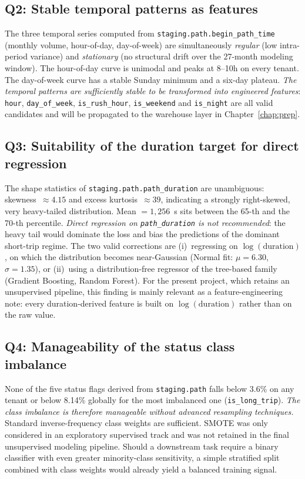 \subsection{Q2: Stable temporal patterns as features}
The three temporal series computed from \texttt{staging.path.begin\_path\_time} (monthly volume, hour-of-day, day-of-week) are simultaneously \emph{regular} (low intra-period variance) and \emph{stationary} (no structural drift over the 27-month modeling window). The hour-of-day curve is unimodal and peaks at 8--10h on every tenant. The day-of-week curve has a stable Sunday minimum and a six-day plateau. \emph{The temporal patterns are sufficiently stable to be transformed into engineered features}: \texttt{hour}, \texttt{day\_of\_week}, \texttt{is\_rush\_hour}, \texttt{is\_weekend} and \texttt{is\_night} are all valid candidates and will be propagated to the warehouse layer in Chapter~\ref{chap:prep}.

\subsection{Q3: Suitability of the duration target for direct regression}
The shape statistics of \texttt{staging.path.path\_duration} are unambiguous: skewness~$\approx 4.15$ and excess kurtosis~$\approx 39$, indicating a strongly right-skewed, very heavy-tailed distribution. Mean $=1{,}256$~s sits between the 65-th and the 70-th percentile. \emph{Direct regression on \texttt{path\_duration} is not recommended}: the heavy tail would dominate the loss and bias the predictions of the dominant short-trip regime. The two valid corrections are (i)~regressing on $\log(\text{duration})$, on which the distribution becomes near-Gaussian (Normal fit: $\mu = 6.30$, $\sigma = 1.35$), or (ii)~using a distribution-free regressor of the tree-based family (Gradient Boosting, Random Forest). For the present project, which retains an unsupervised pipeline, this finding is mainly relevant as a feature-engineering note: every duration-derived feature is built on $\log(\text{duration})$ rather than on the raw value.

\subsection{Q4: Manageability of the status class imbalance}
None of the five status flags derived from \texttt{staging.path} falls below 3.6\% on any tenant or below 8.14\% globally for the most imbalanced one (\texttt{is\_long\_trip}). \emph{The class imbalance is therefore manageable without advanced resampling techniques.} Standard inverse-frequency class weights are sufficient. SMOTE was only considered in an exploratory supervised track and was not retained in the final unsupervised modeling pipeline. Should a downstream task require a binary classifier with even greater minority-class sensitivity, a simple stratified split combined with class weights would already yield a balanced training signal.

